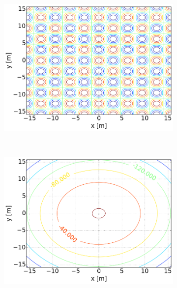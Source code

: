 \pagebreak
\begin{figure}[H]
    \centering
    \begin{subfigure}{0.3\textwidth}
        \centering
        \includegraphics[width=\linewidth]{../4a_0_5_300.png}
        \caption{}
    \end{subfigure}%
    ~
    \begin{subfigure}{0.3\textwidth}
        \centering
        \includegraphics[width=\linewidth]{../4a_1_5_300.png}
        \caption{}
    \end{subfigure}
    ~
    \begin{subfigure}{0.3\textwidth}
        \centering

\end{subfigure}
\end{figure}
